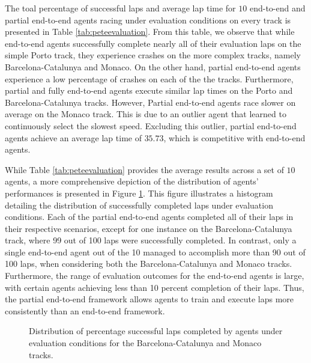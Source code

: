 The toal percentage of successful laps and average lap time for $10$ end-to-end and partial end-to-end agents racing under evaluation conditions on every track is presented in Table \ref{tab:peteevaluation}.
From this table, we observe that while end-to-end agents successfully complete nearly all of their evaluation laps on the simple Porto track, they experience crashes on the more complex tracks, namely Barcelona-Catalunya and Monaco.
On the other hand, partial end-to-end agents experience a low percentage of crashes on each of the the tracks.
Furthermore, partial and fully end-to-end agents execute similar lap times on the Porto and Barcelona-Catalunya tracks.
However, Partial end-to-end agents race slower on average on the Monaco track.
This is due to an outlier agent that learned to continuously select the slowest speed.
Excluding this outlier, partial end-to-end agents achieve an average lap time of $35.73$, which is competitive with end-to-end agents. 



While Table \ref{tab:peteevaluation} provides the average results across a set of $10$ agents, 
a more comprehensive depiction of the distribution of agents' performances is presented in Figure \ref{fig:eval_dists}. 
This figure illustrates a histogram detailing the distribution of successfully completed laps under evaluation conditions.
Each of the partial end-to-end agents completed all of their laps in their respective scenarios, 
except for one instance on the Barcelona-Catalunya track, where 99 out of 100 laps were successfully completed. 
In contrast, only a single end-to-end agent out of the 10 managed to accomplish more than 90 out of 100 laps, when considering both the Barcelona-Catalunya and Monaco tracks.
Furthermore, the range of evaluation outcomes for the end-to-end agents is large, with certain agents achieving less than 10 percent completion of their laps. 
Thus, the partial end-to-end framework allows agents to train and execute laps more consistently than an end-to-end framework.


\begin{figure}[htb!]
    \centering
    
    \caption[Distribution of percentage successful laps completed by agents under evaluation conditions]{Distribution of percentage successful laps completed by agents under evaluation conditions for the Barcelona-Catalunya and Monaco tracks.}
    \label{fig:eval_dists}
\end{figure}


